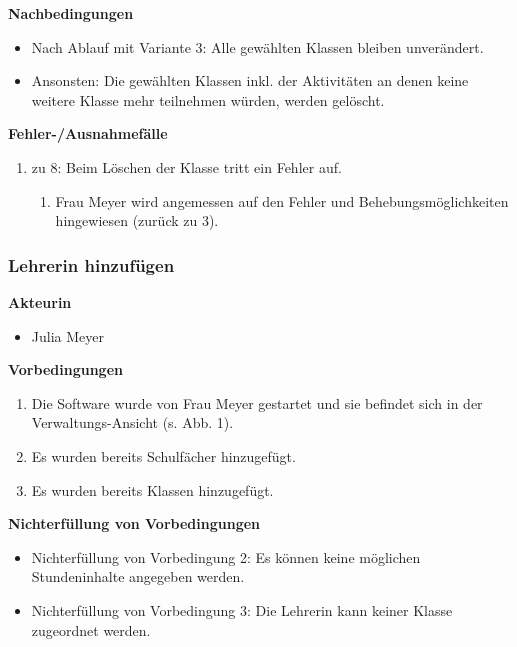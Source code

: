\documentclass[fontsize=12pt,paper=a4,twoside]{scrartcl}
\begin{document}
\textbf{Nachbedingungen}
\begin{itemize}
\item Nach Ablauf mit Variante 3: Alle gewählten Klassen bleiben unverändert.
\item Ansonsten: Die gewählten Klassen inkl. der Aktivitäten an denen keine weitere Klasse mehr teilnehmen würden, werden gelöscht. 
\end{itemize}
\vspace{5pt}

\textbf{Fehler-/Ausnahmefälle}
\begin{enumerate}
\item zu 8: Beim Löschen der Klasse tritt ein Fehler auf.
	\begin{enumerate}[label=\arabic*.]
	\item Frau Meyer wird angemessen auf den Fehler und Behebungsmöglichkeiten hingewiesen (zurück zu 3).
	\end{enumerate}
\end{enumerate}


\subsubsection{Lehrerin hinzufügen}
\label{subsubsec:LehrerinHinzufuegen}
\textbf{Akteurin}
\begin{itemize}
\item Julia Meyer
\end{itemize}
\vspace{5pt}


\textbf{Vorbedingungen}
\begin{enumerate}
\item Die Software wurde von Frau Meyer gestartet und sie befindet sich in der Verwaltungs-Ansicht (s. Abb. 1).
\item Es wurden bereits Schulfächer hinzugefügt.
\item Es wurden bereits Klassen hinzugefügt.
\end{enumerate}
\vspace{5pt}

\textbf{Nichterfüllung von Vorbedingungen}
\begin{itemize}
\item Nichterfüllung von Vorbedingung 2: Es können keine möglichen Stundeninhalte angegeben werden.
\item Nichterfüllung von Vorbedingung 3: Die Lehrerin kann keiner Klasse zugeordnet werden.
\end{itemize}
\vspace{5pt}
\end{document}
